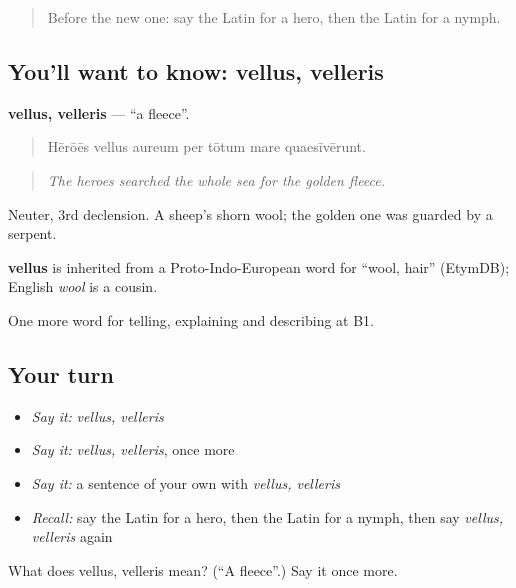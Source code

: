 \label{lesson:LA-C347-vellus}



\begin{quote}
Before the new one: say the Latin for a hero, then the Latin for a nymph.
\end{quote}

\subsection*{You'll want to know: vellus, velleris}
\textbf{vellus, velleris} — \textquotedblleft{}a fleece\textquotedblright{}.

\begin{quote}
Hērōēs vellus aureum per tōtum mare quaesīvērunt.
\end{quote}

\begin{quote}
\emph{The heroes searched the whole sea for the golden fleece.}
\end{quote}

Neuter, 3rd declension. A sheep's shorn wool; the golden one was guarded by a serpent.

\begin{cousinweb}
\textbf{vellus} is inherited from a Proto-Indo-European word for \textquotedblleft{}wool, hair\textquotedblright{} (EtymDB); English \emph{wool} is a cousin.
\end{cousinweb}

\begin{grammarlens}[title={What you've built}]
One more word for telling, explaining and describing at B1.
\end{grammarlens}

\subsection*{Your turn}
\begin{itemize}
\raggedright
  \item \emph{Say it:} \emph{vellus, velleris}
  \item \emph{Say it:} \emph{vellus, velleris}, once more
  \item \emph{Say it:} a sentence of your own with \emph{vellus, velleris}
  \item \emph{Recall:} say the Latin for a hero, then the Latin for a nymph, then say \emph{vellus, velleris} again
\end{itemize}

\begin{tcolorbox}[breakable,colback=teal!4,colframe=teal!35!black,title={Before you move on}]
What does vellus, velleris mean? (\textquotedblleft{}A fleece\textquotedblright{}.) Say it once more.
\end{tcolorbox}
